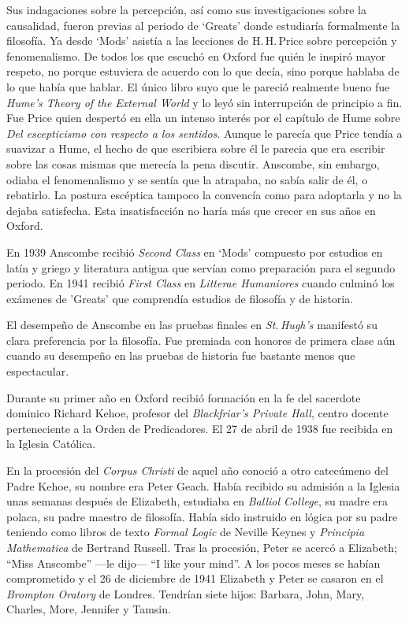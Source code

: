 Sus indagaciones sobre la percepción, así como sus investigaciones sobre la causalidad, fueron previas al periodo de `Greats' donde estudiaría formalmente la filosofía. Ya desde `Mods' asistía a las lecciones de H.\,H.\,Price sobre percepción y fenomenalismo. De todos los que escuchó en Oxford fue quién le inspiró mayor respeto, no porque estuviera de acuerdo con lo que decía, sino porque hablaba de lo que había que hablar. El único libro suyo que le pareció realmente bueno fue \emph{Hume's Theory of the External World} y lo leyó sin interrupción de principio a fin. Fue Price quien despertó en ella un intenso interés por el capítulo de Hume sobre \emph{Del escepticismo con respecto a los sentidos}. Aunque le parecía que Price tendía a suavizar a Hume, el hecho de que escribiera sobre él le parecia que era escribir sobre las cosas mismas que merecía la pena discutir. Anscombe, sin embargo, odiaba el fenomenalismo y se sentía que la atrapaba, no sabía salir de él, o rebatirlo. La postura escéptica tampoco la convencía como para adoptarla y no la dejaba satisfecha. Esta insatisfacción no haría más que crecer en sus años en Oxford\autocites[Cf.~][viii]{anscombe1981metaphysics} [~y~][26]{torralba2005accion}.

En 1939 Anscombe recibió \emph{Second Class} en `Mods' compuesto por estudios en latín y griego y literatura antigua que servían como preparación para el segundo periodo. En 1941 recibió \emph{First Class} en \emph{Litterae Humaniores} cuando culminó los exámenes de 'Greats' que comprendía estudios de filosofía y de historia.

El desempeño de Anscombe en las pruebas finales en \emph{St.\,Hugh's} manifestó su clara preferencia por la filosofía. Fue premiada con honores de primera clase aún cuando su desempeño en las pruebas de historia fue bastante menos que espectacular\autocite[Cf.~][3]{teichmann2008ans}.

Durante su primer año en Oxford recibió formación en la fe del sacerdote dominico Richard Kehoe, profesor del \emph{Blackfriar's Private Hall}, centro docente perteneciente a la Orden de Predicadores. El 27 de abril de 1938 fue recibida en la Iglesia Católica.

En la procesión del \emph{Corpus Christi} de aquel año conoció a otro catecúmeno del Padre Kehoe, su nombre era Peter Geach. Había recibido su admisión a la Iglesia unas semanas después de Elizabeth, estudiaba en \emph{Balliol College}, su madre era polaca, su padre maestro de filosofía. Había sido instruido en lógica por su padre teniendo como libros de texto \emph{Formal Logic} de Neville Keynes y \emph{Principia Mathematica} de Bertrand Russell. Tras la procesión, Peter se acercó a Elizabeth; \enquote{Miss Anscombe} ---le dijo--- \enquote{I like your mind}\autocite[Cf.~][187]{kenny2016fellows}. A los pocos meses se habían comprometido y el 26 de diciembre de 1941 Elizabeth y Peter se casaron en el \emph{Brompton Oratory} de Londres\autocite[Cf.~][33]{teichman2002fellows}. Tendrían siete hijos: Barbara, John, Mary, Charles, More, Jennifer y Tamsin.

